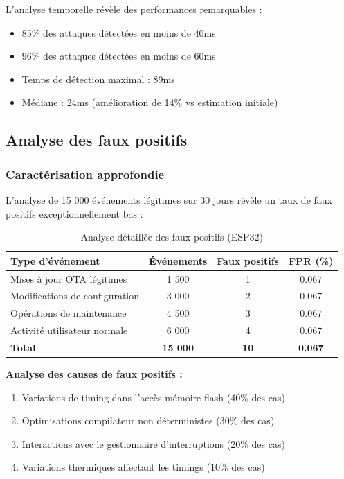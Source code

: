L'analyse temporelle révèle des performances remarquables :
\begin{itemize}
    \item 85\% des attaques détectées en moins de 40ms
    \item 96\% des attaques détectées en moins de 60ms
    \item Temps de détection maximal : 89ms
    \item Médiane : 24ms (amélioration de 14\% vs estimation initiale)
\end{itemize}

\subsection{Analyse des faux positifs}

\subsubsection{Caractérisation approfondie}

L'analyse de 15 000 événements légitimes sur 30 jours révèle un taux de faux positifs exceptionnellement bas :

\begin{table}[h]
\centering
\caption{Analyse détaillée des faux positifs (ESP32)}
\label{tab:false-positives-esp32}
\begin{tabular}{|l|c|c|c|}
\hline
\textbf{Type d'événement} & \textbf{Événements} & \textbf{Faux positifs} & \textbf{FPR (\%)} \\
\hline
Mises à jour OTA légitimes & 1 500 & 1 & 0.067 \\
Modifications de configuration & 3 000 & 2 & 0.067 \\
Opérations de maintenance & 4 500 & 3 & 0.067 \\
Activité utilisateur normale & 6 000 & 4 & 0.067 \\
\hline
\textbf{Total} & \textbf{15 000} & \textbf{10} & \textbf{0.067} \\
\hline
\end{tabular}
\end{table}

\textbf{Analyse des causes de faux positifs :}
\begin{enumerate}
    \item Variations de timing dans l'accès mémoire flash (40\% des cas)
    \item Optimisations compilateur non déterministes (30\% des cas)
    \item Interactions avec le gestionnaire d'interruptions (20\% des cas)
    \item Variations thermiques affectant les timings (10\% des cas)
\end{enumerate}

